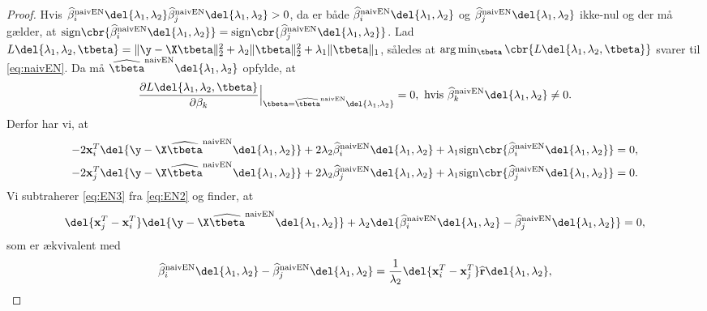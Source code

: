 %
\begin{proof}
Hvis \(\widehat{\beta}^\text{naivEN}_i \del{\lambda_1, \lambda_2} \widehat{\beta}^\text{naivEN}_j \del{\lambda_1, \lambda_2} > 0\), da er både \(\widehat{\beta}^\text{naivEN}_i \del{\lambda_1, \lambda_2}\) og \(\widehat{\beta}^\text{naivEN}_j \del{\lambda_1, \lambda_2}\) ikke-nul og der må gælder, at \(\text{sign} \cbr{\widehat{\beta}^\text{naivEN}_i \del{\lambda_1, \lambda_2}} = \text{sign} \cbr{\widehat{\beta}^\text{naivEN}_j \del{\lambda_1, \lambda_2}}\).
Lad \(L \del{\lambda_1,\lambda_2, \tbeta} = \Vert \y - \X \tbeta \Vert_2^2 + \lambda_2 \Vert \tbeta \Vert_2^2 + \lambda_1 \Vert \tbeta \Vert_1\), således at \(\arg \min_{\tbeta} \cbr{L \del{\lambda_1,\lambda_2, \tbeta}}\) svarer til \eqref{eq:naivEN}.
Da må \(\widehat{\tbeta}^\text{naivEN} \del{\lambda_1, \lambda_2}\) opfylde, at
\begin{align*}
\frac{\partial L \del{\lambda_1,\lambda_2, \tbeta} }{\partial \beta_k} \Bigr|_{\tbeta = \widehat{\tbeta}^\text{naivEN} \del{\lambda_1, \lambda_2}}=0, \text{ hvis } \widehat{\beta}^\text{naivEN}_k \del{\lambda_1, \lambda_2} \neq 0.
\end{align*}
Derfor har vi, at
\begin{align}
-2 \mathbf{x}_i^T \del{\y - \X \widehat{\tbeta}^\text{naivEN} \del{\lambda_1, \lambda_2}} +  2 \lambda_2 \widehat{\beta}^\text{naivEN}_i \del{\lambda_1, \lambda_2} + \lambda_1 \text{sign} \cbr{\widehat{\beta}^\text{naivEN}_i \del{\lambda_1, \lambda_2}} &= 0, \label{eq:EN2}\\
-2 \mathbf{x}_j^T \del{\y - \X \widehat{\tbeta}^\text{naivEN} \del{\lambda_1, \lambda_2}} + 2 \lambda_2 \widehat{\beta}^\text{naivEN}_j \del{\lambda_1, \lambda_2} + \lambda_1 \text{sign} \cbr{\widehat{\beta}^\text{naivEN}_j \del{\lambda_1, \lambda_2}} &= 0. \label{eq:EN3}
\end{align}
Vi subtraherer \eqref{eq:EN3} fra \eqref{eq:EN2} og finder, at
\begin{align*}
\del{\mathbf{x}_j^T-\mathbf{x}_i^T} \del{\y - \X \widehat{\tbeta}^\text{naivEN} \del{\lambda_1, \lambda_2}} + \lambda_2 \del{\widehat{\beta}^\text{naivEN}_i \del{\lambda_1, \lambda_2} - \widehat{\beta}^\text{naivEN}_j \del{\lambda_1, \lambda_2}} =0,
\end{align*}
som er ækvivalent med
\begin{align}
\widehat{\beta}^\text{naivEN}_i \del{\lambda_1, \lambda_2} - \widehat{\beta}^\text{naivEN}_j \del{\lambda_1, \lambda_2} = \frac{1}{\lambda_2} \del{\mathbf{x}_i^T-\mathbf{x}_j^T} \widehat{\mathbf{r}}\del{\lambda_1, \lambda_2}, \label{eq:EN4}

\end{align}
\end{proof}
